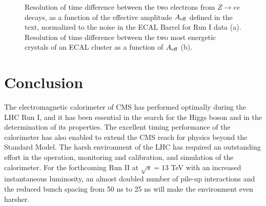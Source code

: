 \documentclass[journal]{IEEEtran}
\begin{document}
\begin{figure}[!t]
  \begin{center}
    \caption{Resolution of time difference between the two electrons from $Z\to ee$ decays, as a function of the effective amplitude $A_{\rm eff}$ defined in the text, normalized to the noise in the ECAL Barrel for Run I data (a). Resolution of time difference between the two most energetic crystals of an ECAL cluster as a function of $A_{\rm eff}$ (b). \label{fig:time_resol}}
  \end{center}
\end{figure}
%


\section{Conclusion}
\label{sec:conclusions}
The electromagnetic calorimeter of CMS has performed optimally during the LHC Run I, and it has been essential in the search for the Higgs boson and in the determination of its properties. The excellent timing performance of the calorimeter has also enabled to extend the CMS reach for physics beyond the Standard Model. The harsh environment of the LHC has required an outstanding effort in the operation, monitoring and calibration, and simulation of the calorimeter. For the forthcoming Run II at $\sqrt{s}=13$ TeV with an increased instantaneous luminosity, an almost doubled number of pile-up interactions and the reduced bunch spacing from 50 ns to 25 ns will make the environment even harsher. 
\end{document}
